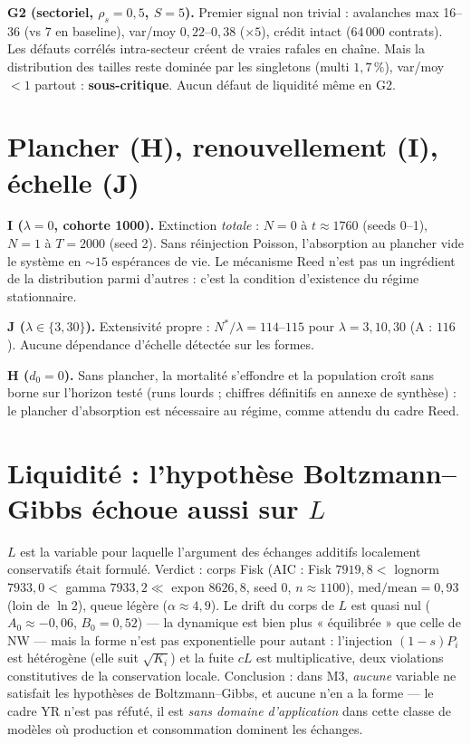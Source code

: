 \documentclass[11pt,a4paper]{article}
\newcommand{\NW}{\mathrm{NW}}
\begin{document}
\textbf{G2 (sectoriel, $\rho_s = 0{,}5$, $S = 5$).} Premier signal non
trivial : avalanches max 16--36 (vs 7 en baseline), var/moy $0{,}22$--$0{,}38$
($\times 5$), crédit intact ($64\,000$ contrats). Les défauts corrélés
intra-secteur créent de vraies rafales en chaîne. Mais la distribution des
tailles reste dominée par les singletons (multi $1{,}7\,\%$), var/moy $< 1$
partout : \textbf{sous-critique}. Aucun défaut de liquidité même en G2.

\section{Plancher (H), renouvellement (I), échelle (J)}

\textbf{I ($\lambda = 0$, cohorte 1000).} Extinction \emph{totale} : $N = 0$
à $t \approx 1760$ (seeds 0--1), $N = 1$ à $T{=}2000$ (seed 2). Sans
réinjection Poisson, l'absorption au plancher vide le système en $\sim 15$
espérances de vie. Le mécanisme Reed n'est pas un ingrédient de la
distribution parmi d'autres : c'est la condition d'existence du régime
stationnaire.

\textbf{J ($\lambda \in \{3, 30\}$).} Extensivité propre :
$N^*/\lambda = 114$--$115$ pour $\lambda = 3, 10, 30$ (A : $116$). Aucune
dépendance d'échelle détectée sur les formes.

\textbf{H ($d_0 = 0$).} %
Sans plancher, la mortalité s'effondre et la population croît sans borne
sur l'horizon testé (runs lourds ; chiffres définitifs en annexe de
synthèse) : le plancher d'absorption est nécessaire au régime, comme
attendu du cadre Reed.

\section{Liquidité : l'hypothèse Boltzmann--Gibbs échoue aussi sur $L$}
\label{sec:L}

$L$ est la variable pour laquelle l'argument des échanges additifs
localement conservatifs était formulé. Verdict : corps Fisk (AIC :
Fisk $7919{,}8 <$ lognorm $7933{,}0 <$ gamma $7933{,}2 \ll$ expon
$8626{,}8$, seed 0, $n \approx 1100$), $\mathrm{med/mean} = 0{,}93$ (loin de
$\ln 2$), queue légère ($\alpha \approx 4{,}9$). Le drift du corps de $L$
est quasi nul ($A_0 \approx -0{,}06$, $B_0 = 0{,}52$) — la dynamique est
bien plus « équilibrée » que celle de $\NW$ — mais la forme n'est pas
exponentielle pour autant : l'injection $(1-s)P_i$ est hétérogène (elle
suit $\sqrt{K_i}$) et la fuite $cL$ est multiplicative, deux violations
constitutives de la conservation locale. Conclusion : dans M3, \emph{aucune}
variable ne satisfait les hypothèses de Boltzmann--Gibbs, et aucune n'en a
la forme — le cadre YR n'est pas réfuté, il est \emph{sans domaine
d'application} dans cette classe de modèles où production et consommation
dominent les échanges.
\end{document}

